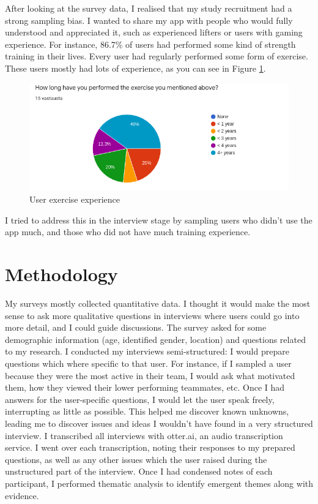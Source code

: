 \documentclass{l4proj}
\begin{document}
After looking at the survey data, I realised that my study recruitment had a strong sampling bias. I wanted to share my app with people who would fully understood and appreciated it, such as experienced lifters or users with gaming experience. For instance, 86.7\% of users had performed some kind of strength training in their lives. Every user had regularly performed some form of exercise. These users mostly had lots of experience, as you can see in Figure \ref{fig:long_performed}.
\begin{figure}[H]
    \centering
    \includegraphics[width=1.0\linewidth]{long_performed.png}    
    \caption{User exercise experience}
    \label{fig:long_performed} 
\end{figure}

I tried to address this in the interview stage by sampling users who didn't use the app much, and those who did not have much training experience. 


\section{Methodology}
My surveys mostly collected quantitative data. I thought it would make the most sense to ask more qualitative questions in interviews where users could go into more detail, and I could guide discussions. The survey asked for some demographic information (age, identified gender, location) and questions related to my research. I conducted my interviews semi-structured: I would prepare questions which where specific to that user. For instance, if I sampled a user because they were the most active in their team, I would ask what motivated them, how they viewed their lower performing teammates, etc. Once I had answers for the user-specific questions, I would let the user speak freely, interrupting as little as possible. This helped me discover known unknowns, leading me to discover issues and ideas I wouldn't have found in a very structured interview. I transcribed all interviews with otter.ai, an audio transcription service. I went over each transcription, noting their responses to my prepared questions, as well as any other issues which the user raised during the unstructured part of the interview. Once I had condensed notes of each participant, I performed thematic analysis to identify emergent themes along with evidence. 
\end{document}
